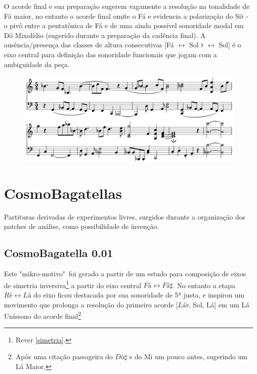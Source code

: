 \documentclass[
	12pt,				%
	openright,			%
	twoside,			%
	a4paper,			%
	english,			%
	french,				%
	spanish,			%
	brazil				%
	]{abntex2}
\begin{document}
O acorde final e sua preparação sugerem vagamente a resolução na tonalidade de Fá maior, no entanto o acorde final omite o Fá e evidencia a polarização do Si$\flat$ - o pivô entre a pentatônica de Fá e de uma ainda possível sonoridade modal em Dó Mixolídio (sugerido durante a preparação da cadência final). A ausência/presença das classes de altura consecutivas [Fá $\leftrightarrow$ Sol $\flat$ $\leftrightarrow$ Sol] é o eixo central para definição das sonoridade funcionais que jogam com a ambiguidade da peça.

\begin{figure}[!h]
	\begin{center}
	    \includegraphics*[scale=0.35]{score/MikroCliche03.png}
	\end{center}
\end{figure}


\pagebreak
\section{CosmoBagatellas}

Partituras derivadas de experimentos livres, surgidos durante a organização dos patches de análise, como possibilidade de invenção. 

\subsection{CosmoBagatella 0.01}

Este "mikro-motivo"\ foi gerado a partir de um estudo para composição de eixos de simetria inversiva\footnote{Rever \autoref{simetria}. } a partir do eixo central $Fá \leftrightarrow Fá\sharp  $. No entanto a etapa $Ré \leftrightarrow Lá$ do eixo ficou destacada por sua sonoridade de 5ª justa, e inspirou um movimento que prolonga a resolução do primeiro acorde [$Lá\flat$, Sol, Lá] em um Lá Uníssono do acorde final\footnote{Após uma citação passageira do $Dó\sharp$ e do Mi um pouco antes, sugerindo um Lá Maior.}
\end{document}
